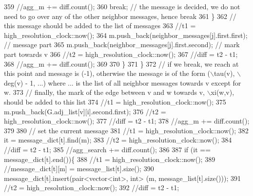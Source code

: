 \begin{DoxyCode}
359 \textcolor{comment}{                //agg\_m += diff.count();}
360 \textcolor{comment}{                break; // the message is decided, we do not need to go over any of the other neighbor
       messages, hence break}
361 \textcolor{comment}{              \}}
362 \textcolor{comment}{              // this message should be added to the list of messages}
363 \textcolor{comment}{              //t1 = high\_resolution\_clock::now();}
364 \textcolor{comment}{              m.push\_back(neighbor\_messages[j].first.first); // message part}
365 \textcolor{comment}{              m.push\_back(neighbor\_messages[j].first.second); // mark part towards v}
366 \textcolor{comment}{              //t2 = high\_resolution\_clock::now();}
367 \textcolor{comment}{              //diff = t2 - t1;}
368 \textcolor{comment}{              //agg\_m += diff.count();}
369 \textcolor{comment}{}
370 \textcolor{comment}{            \}}
371 \textcolor{comment}{          \}}
372 \textcolor{comment}{          // if we break, we reach at this point and message is (-1), otherwise the message is of the form
       (\(\backslash\)tau(v), \(\backslash\)deg(v) - 1, ...) where ... is the list of all neighbor messages towards v except for w. }
373 \textcolor{comment}{          // finally, the mark of the edge between v and w towards v, \(\backslash\)xi(w,v), should be added to this
       list}
374 \textcolor{comment}{          //t1 = high\_resolution\_clock::now();}
375 \textcolor{comment}{          m.push\_back(G.adj\_list[v][i].second.first);}
376 \textcolor{comment}{          //t2 = high\_resolution\_clock::now();}
377 \textcolor{comment}{          //diff = t2 - t1;}
378 \textcolor{comment}{          //agg\_m += diff.count();}
379 \textcolor{comment}{}
380 \textcolor{comment}{          // set the current message}
381 \textcolor{comment}{          //t1 = high\_resolution\_clock::now();}
382 \textcolor{comment}{          it = message\_dict[t].find(m);}
383 \textcolor{comment}{          //t2 = high\_resolution\_clock::now();}
384 \textcolor{comment}{          //diff = t2 - t1;}
385 \textcolor{comment}{          //agg\_search += diff.count();}
386 \textcolor{comment}{}
387 \textcolor{comment}{          if (it == message\_dict[t].end())\{}
388 \textcolor{comment}{            //t1 = high\_resolution\_clock::now();}
389 \textcolor{comment}{            //message\_dict[t][m] = message\_list[t].size();}
390 \textcolor{comment}{            message\_dict[t].insert(pair<vector<int>, int> (m, message\_list[t].size()));}
391 \textcolor{comment}{            //t2 = high\_resolution\_clock::now();}
392 \textcolor{comment}{            //diff = t2 - t1;}

\end{DoxyCode}
